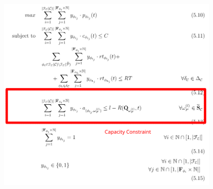 \documentclass[13.5pt]{beamer}
\begin{document}
\begin{frame}
	
	\begin{figure}[h]
		\centering
		\includegraphics[width=\textwidth,height=0.8\columnwidth]{../Images/MMKPForSlide4.png}
	\end{figure}
	
	
\end{frame}
\end{document}

